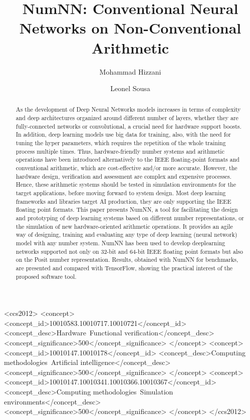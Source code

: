 \documentclass[anonymous,review,acmsmall,10pt]{acmart}
\title{NumNN: Conventional Neural Networks on Non-Conventional Arithmetic}
\author{Mohammad Hizzani}
\affiliation{%
	\department{INESC-ID}
	\department{Instituto Superior Técnico}
	\institution{University of Lisbon}
	\city{Lisbon}
	\country{Portugal}
}
\author{Leonel Sousa}
\affiliation{%
	\department{INESC-ID}
	\department{Instituto Superior Técnico}
	\institution{University of Lisbon}
	\streetaddress{Rua Alves Redol 9}
	\postcode{1000-029}
	\city{Lisbon}
	\country{Portugal}
}
\begin{document}
	\begin{abstract}
		As the development of Deep Neural Networks models increases in terms of complexity and deep architectures organized around different number of layers, whether they are fully-connected networks or convolutional, a crucial need for hardware support boosts. In addition, deep learning models use big data for training, also, with the need for tuning the hyper parameters, which requires the repetition of the whole training process multiple times. Thus, hardware-friendly number systems and arithmetic operations have been introduced alternatively to the IEEE floating-point formats and conventional arithmetic, which are cost-effective and/or more accurate. However, the hardware design, verification and assessment are complex and expensive processes. Hence, these arithmetic systems should be tested in simulation environments for the target applications, before moving forward to system design. Most deep learning frameworks and libraries target AI production, they are only supporting the IEEE floating point formats. This paper presents NumNN, a tool for facilitating the design and prototyping of deep learning systems based on different number representations, or the simulation of new hardware-oriented arithmetic operations. It provides an agile way of designing, training and evaluating any type of deep learning (neural network) model with any number system. NumNN has been used to develop deeplearning networks supported not only on 32-bit and 64-bit IEEE floating point formats but also on the Posit number representation.  Results, obtained with NumNN for benchmarks, are presented and compared with TensorFlow, showing the practical interest of the proposed software tool.
	\end{abstract}

\begin{CCSXML}
	<ccs2012>
	<concept>
	<concept_id>10010583.10010717.10010721</concept_id>
	<concept_desc>Hardware~Functional verification</concept_desc>
	<concept_significance>500</concept_significance>
	</concept>
	<concept>
	<concept_id>10010147.10010178</concept_id>
	<concept_desc>Computing methodologies~Artificial intelligence</concept_desc>
	<concept_significance>500</concept_significance>
	</concept>
	<concept>
	<concept_id>10010147.10010341.10010366.10010367</concept_id>
	<concept_desc>Computing methodologies~Simulation environments</concept_desc>
	<concept_significance>500</concept_significance>
	</concept>
	</ccs2012>
\end{CCSXML}
\end{document}
